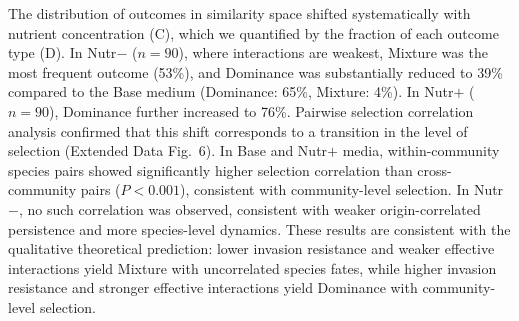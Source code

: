  The distribution of outcomes in similarity space shifted systematically with nutrient concentration (C), which we quantified by the fraction of each outcome type (D). In Nutr$-$ ($n = 90$), where interactions are weakest, Mixture was the most frequent outcome (53\%), and Dominance was substantially reduced to 39\% compared to the Base medium (Dominance: 65\%, Mixture: 4\%). In Nutr$+$ ($n = 90$), Dominance further increased to 76\%.  Pairwise selection correlation analysis confirmed that this shift corresponds to a transition in the level of selection (Extended Data Fig.~6). In Base and Nutr$+$ media, within-community species pairs showed significantly higher selection correlation than cross-community pairs ($P < 0.001$), consistent with community-level selection. In Nutr$-$, no such correlation was observed, consistent with weaker origin-correlated persistence and more species-level dynamics.  These results are consistent with the qualitative theoretical prediction: lower invasion resistance and weaker effective interactions yield Mixture with uncorrelated species fates, while higher invasion resistance and stronger effective interactions yield Dominance with community-level selection.

